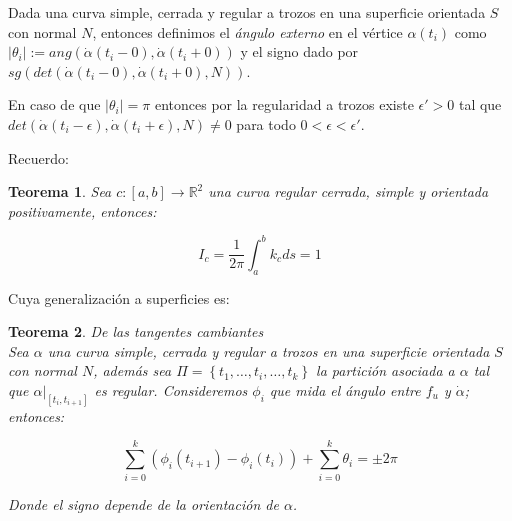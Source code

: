\documentclass[11pt]{article}
\newcommand{\R}{{\mathbb{R}}}
\newcommand\abs[1]{\left\lvert#1\right\rvert}
\newcommand{\sett}[1]{\left\lbrace#1\right\rbrace}
\newtheorem{theorem}{Teorema}[section]
\newenvironment{definition}[1][Definici\'on]{\begin{trivlist}
		\item[\hskip \labelsep {\bfseries #1}]}{\end{trivlist}}
\begin{document}
\begin{definition}
	Dada una curva simple, cerrada y regular a trozos en una superficie orientada $S$ con normal $N$, entonces definimos el \textit{\'angulo externo} en el v\'ertice $\alpha(t_i)$ como $\abs{\theta_i} := ang \left(\dot{\alpha}(t_i - 0), \dot{\alpha}(t_i + 0) \right)$ y el signo dado por $sg \left(det(\dot{\alpha}(t_i - 0), \dot{\alpha}(t_i + 0), N)\right)$.
	
	En caso de que $\abs{\theta_i} = \pi$ entonces por la regularidad a trozos existe $\epsilon' > 0$ tal que $det \left(\dot{\alpha}(t_i - \epsilon), \dot{\alpha}(t_i + \epsilon), N\right) \neq 0$ para todo $0 < \epsilon < \epsilon'$.
	
\end{definition}

Recuerdo:

\begin{theorem}
	Sea $c : [a,b] \rightarrow \R^2$ una curva regular cerrada, simple y orientada positivamente, entonces:
	
	\begin{equation*}
		I_{c} = \frac{1}{2\pi} \int_{a}^{b}{k_c ds} = 1
	\end{equation*}
	
\end{theorem}

Cuya generalizaci\'on a superficies es:

\begin{theorem}{De las tangentes cambiantes}
	\label{Teo de las tangentes cambiantes}
	\\
	Sea $\alpha$  una curva simple, cerrada y regular a trozos en una superficie orientada $S$ con normal $N$, adem\'as sea $\Pi = \sett{t_1 , \dots , t_i , \dots , t_k}$ la partici\'on asociada a $\alpha$ tal que $\alpha|_{[t_i,t_{i+1}]}$ es regular. Consideremos $\phi_i$ que mida el \'angulo entre $f_u$ y $\dot{\alpha}$; entonces:
	
	\[
	\sum\limits_{i = 0}^{k}{\left(\phi_i (t_{i+1}) - \phi_i(t_i)\right)} + \sum\limits_{i = 0}^{k}{\theta_i} = \pm 2\pi
	\]	
	
	Donde el signo depende de la orientaci\'on de $\alpha$.
	
\end{theorem}
\end{document}
